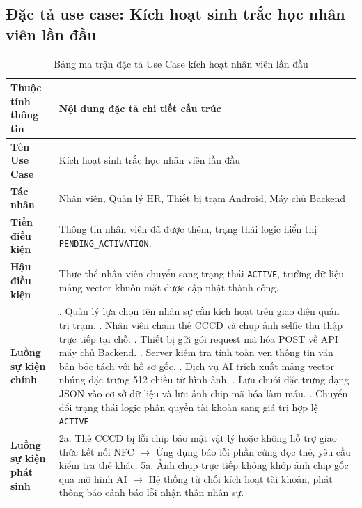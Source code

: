 \documentclass[../DoAn.tex]{subfiles}
\begin{document}
\subsection{Đặc tả use case: Kích hoạt sinh trắc học nhân viên lần đầu}
\label{subsection:2.3.2}

\begin{table}[ht!]
\centering
\small
\renewcommand{\arraystretch}{1.3}
\caption{Bảng ma trận đặc tả Use Case kích hoạt nhân viên lần đầu}
\label{tab:spec_activation}
\begin{tabular}{|>{\raggedright\arraybackslash}p{3.5cm}|>{\raggedright\arraybackslash}p{10.1cm}|}
\hline
\textbf{Thuộc tính thông tin} & \textbf{Nội dung đặc tả chi tiết cấu trúc} \\ \hline
\textbf{Tên Use Case} & Kích hoạt sinh trắc học nhân viên lần đầu \\ \hline
\textbf{Tác nhân} & Nhân viên, Quản lý HR, Thiết bị trạm Android, Máy chủ Backend \\ \hline
\textbf{Tiền điều kiện} & Thông tin nhân viên đã được thêm, trạng thái logic hiển thị \texttt{PENDING\_ACTIVATION}. \\ \hline
\textbf{Hậu điều kiện} & Thực thể nhân viên chuyển sang trạng thái \texttt{ACTIVE}, trường dữ liệu mảng vector khuôn mặt được cập nhật thành công. \\ \hline
\textbf{Luồng sự kiện chính} & 
1. Quản lý lựa chọn tên nhân sự cần kích hoạt trên giao diện quản trị trạm. \newline
2. Nhân viên chạm thẻ CCCD và chụp ảnh selfie thu thập trực tiếp tại chỗ. \newline
3. Thiết bị gửi gói request mã hóa POST về API máy chủ Backend. \newline
4. Server kiểm tra tính toàn vẹn thông tin văn bản bóc tách với hồ sơ gốc. \newline
5. Dịch vụ AI trích xuất mảng vector nhúng đặc trưng 512 chiều từ hình ảnh. \newline
6. Lưu chuỗi đặc trưng dạng JSON vào cơ sở dữ liệu và lưu ảnh chip mã hóa làm mẫu. \newline
7. Chuyển đổi trạng thái logic phân quyền tài khoản sang giá trị hợp lệ \texttt{ACTIVE}. \\ \hline
\textbf{Luồng sự kiện phát sinh} & 
2a. Thẻ CCCD bị lỗi chip bảo mật vật lý hoặc không hỗ trợ giao thức kết nối NFC $\rightarrow$ Ứng dụng báo lỗi phần cứng đọc thẻ, yêu cầu kiểm tra thẻ khác. \newline
5a. Ảnh chụp trực tiếp không khớp ảnh chip gốc qua mô hình AI $\rightarrow$ Hệ thống từ chối kích hoạt tài khoản, phát thông báo cảnh báo lỗi nhận thân nhân sự. \\ \hline
\end{tabular}
\end{table}
\end{document}
